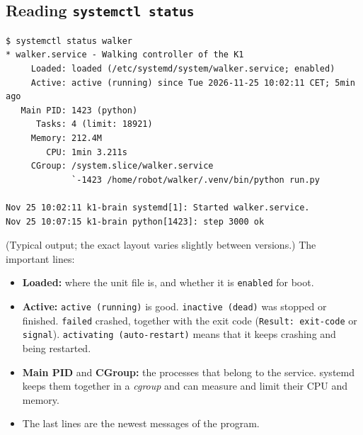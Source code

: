\subsection*{Reading \texttt{systemctl status}}
\begin{verbatim}
$ systemctl status walker
* walker.service - Walking controller of the K1
     Loaded: loaded (/etc/systemd/system/walker.service; enabled)
     Active: active (running) since Tue 2026-11-25 10:02:11 CET; 5min ago
   Main PID: 1423 (python)
      Tasks: 4 (limit: 18921)
     Memory: 212.4M
        CPU: 1min 3.211s
     CGroup: /system.slice/walker.service
             `-1423 /home/robot/walker/.venv/bin/python run.py

Nov 25 10:02:11 k1-brain systemd[1]: Started walker.service.
Nov 25 10:07:15 k1-brain python[1423]: step 3000 ok
\end{verbatim}
(Typical output; the exact layout varies slightly between versions.) The important lines:
\begin{itemize}[nosep]
  \item \textbf{Loaded:} where the unit file is, and whether it is \texttt{enabled} for boot.
  \item \textbf{Active:} \texttt{active (running)} is good. \texttt{inactive (dead)} was stopped or finished. \texttt{failed} crashed, together with the exit code (\texttt{Result: exit-code} or \texttt{signal}). \texttt{activating (auto-restart)} means that it keeps crashing and being restarted.
  \item \textbf{Main PID} and \textbf{CGroup:} the processes that belong to the service. systemd keeps them together in a \emph{cgroup} and can measure and limit their CPU and memory.
  \item The last lines are the newest messages of the program.
\end{itemize}


